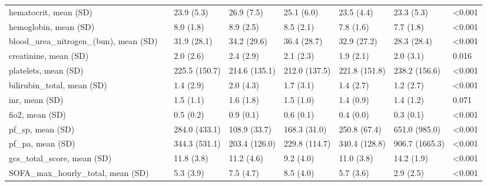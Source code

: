 \begin{tabular}{llllllll}
hematocrit, mean (SD) &        &                    23.9 (5.3) &     26.9 (7.5) &     25.1 (6.0) &     23.5 (4.4) &      23.3 (5.3) &  <0.001 \\
hemoglobin, mean (SD) &        &                     8.0 (1.8) &      8.9 (2.5) &      8.5 (2.1) &      7.8 (1.6) &       7.7 (1.8) &  <0.001 \\
blood\_urea\_nitrogen\_(bun), mean (SD) &        &                   31.9 (28.1) &    34.2 (29.6) &    36.4 (28.7) &    32.9 (27.2) &     28.3 (28.4) &  <0.001 \\
creatinine, mean (SD) &        &                     2.0 (2.6) &      2.4 (2.9) &      2.1 (2.3) &      1.9 (2.1) &       2.0 (3.1) &   0.016 \\
platelets, mean (SD) &        &                 225.5 (150.7) &  214.6 (135.1) &  212.0 (137.5) &  221.8 (151.8) &   238.2 (156.6) &  <0.001 \\
bilirubin\_total, mean (SD) &        &                     1.4 (2.9) &      2.0 (4.3) &      1.7 (3.1) &      1.4 (2.7) &       1.2 (2.7) &  <0.001 \\
inr, mean (SD) &        &                     1.5 (1.1) &      1.6 (1.8) &      1.5 (1.0) &      1.4 (0.9) &       1.4 (1.2) &   0.071 \\
fio2, mean (SD) &        &                     0.5 (0.2) &      0.9 (0.1) &      0.6 (0.1) &      0.4 (0.0) &       0.3 (0.1) &  <0.001 \\
pf\_sp, mean (SD) &        &                 284.0 (433.1) &   108.9 (33.7) &   168.3 (31.0) &   250.8 (67.4) &   651.0 (985.0) &  <0.001 \\
pf\_pa, mean (SD) &        &                 344.3 (531.1) &  203.4 (126.0) &  229.8 (114.7) &  340.4 (128.8) &  906.7 (1665.3) &  <0.001 \\
gcs\_total\_score, mean (SD) &        &                    11.8 (3.8) &     11.2 (4.6) &      9.2 (4.0) &     11.0 (3.8) &      14.2 (1.9) &  <0.001 \\
SOFA\_max\_hourly\_total, mean (SD) &        &                     5.3 (3.9) &      7.5 (4.7) &      8.5 (4.0) &      5.7 (3.6) &       2.9 (2.5) &  <0.001 \\
\bottomrule
\end{tabular}

